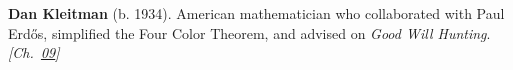 \textbf{Dan Kleitman} (b. 1934). American mathematician who collaborated with Paul Erd\H{o}s, simplified the Four Color Theorem, and advised on \emph{Good Will Hunting}. \emph{[Ch.~\hyperref[ch:arrowtheoremtopology]{09}]}

